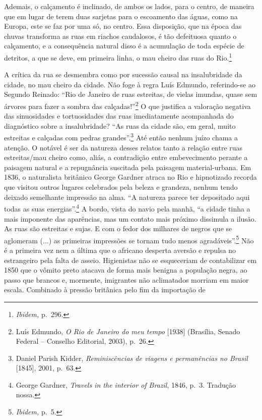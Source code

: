 Ademais, o calçamento é inclinado, de ambos os lados, para o centro, de
maneira que em lugar de terem duas sarjetas para o escoamento das águas,
como na Europa, este se faz por uma só, no centro. Essa disposição, que
na época das chuvas transforma as ruas em riachos caudalosos, é tão
defeituosa quanto o calçamento, e a consequência natural disso é a
acumulação de toda espécie de detritos, a que se deve, em primeira
linha, o mau cheiro das ruas do Rio.\footnote{\emph{Ibidem,} p.~296.}

A crítica da rua se desmembra como por sucessão causal na insalubridade
da cidade, no mau cheiro da cidade. Não foge à regra Luís Edmundo,
referindo-se ao Segundo Reinado: ``Rio de Janeiro de ruas estreitas, de
vielas imundas, quase sem árvores para fazer a sombra das
calçadas!''\footnote{Luís Edmundo, \emph{O Rio de Janeiro do meu tempo}
  {[}1938{]} (Brasília, Senado Federal -- Conselho Editorial, 2003),
  p.~26.} O que justifica a valoração negativa das sinuosidades e
tortuosidades das ruas imediatamente acompanhada do diagnóstico sobre a
insalubridade? ``As ruas da cidade são, em geral, muito estreitas e
calçadas com pedras grandes''.\footnote{Daniel Parish Kidder,
  \emph{Reminiscências de viagens e permanências no Brasil} {[}1845{]},
  2001, p.~63.} Até então nenhum juízo chama a atenção. O notável é ser
da natureza desses relatos tanto a relação entre ruas estreitas/mau
cheiro como, aliás, a contradição entre embevecimento perante a paisagem
natural e a repugnância suscitada pela paisagem material-urbana. Em
1836, o naturalista britânico George Gardner atraca no Rio e hipnotizado
recorda que visitou outros lugares celebrados pela beleza e grandeza,
nenhum tendo deixado semelhante impressão na alma. ``A natureza parece
ter depositado aqui todas as suas energias''.\footnote{George Gardner,
  \emph{Travels in the interior of Brazil}, 1846, p.~3. Tradução nossa.}
A bordo, vista do navio pela manhã, ``a cidade tinha a mais imponente
das aparências, mas um contato mais próximo dissimula a ilusão. As ruas
são estreitas e sujas. E com o fedor dos milhares de negros que se
aglomeram (...) as primeiras impressões se tornam tudo menos
agradáveis''.\footnote{\emph{Ibidem,} p.~5.} Não é a primeira vez nem a
última que o africano desperta aversão e repulsa no estrangeiro pela
falta de asseio. Higienistas não se esqueceriam de contabilizar em 1850
que o vômito preto atacava de forma mais benigna a população negra, ao
passo que brancos e, mormente, imigrantes não aclimatados morriam em
maior escala. Combinado à pressão britânica pelo fim da importação de
